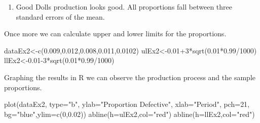 \documentclass[
  letterpaper,
  DIV=11,
  numbers=noendperiod]{scrreprt}
\newenvironment{Shaded}{\begin{snugshade}}{\end{snugshade}}
\newcommand{\AttributeTok}[1]{\textcolor[rgb]{0.40,0.45,0.13}{#1}}
\newcommand{\DecValTok}[1]{\textcolor[rgb]{0.68,0.00,0.00}{#1}}
\newcommand{\FloatTok}[1]{\textcolor[rgb]{0.68,0.00,0.00}{#1}}
\newcommand{\FunctionTok}[1]{\textcolor[rgb]{0.28,0.35,0.67}{#1}}
\newcommand{\NormalTok}[1]{\textcolor[rgb]{0.00,0.23,0.31}{#1}}
\newcommand{\OtherTok}[1]{\textcolor[rgb]{0.00,0.23,0.31}{#1}}
\newcommand{\SpecialCharTok}[1]{\textcolor[rgb]{0.37,0.37,0.37}{#1}}
\newcommand{\StringTok}[1]{\textcolor[rgb]{0.13,0.47,0.30}{#1}}
\providecommand{\tightlist}{%
  \setlength{\itemsep}{0pt}\setlength{\parskip}{0pt}}\usepackage{longtable,booktabs,array}
\begin{document}
\begin{enumerate}
\def\labelenumi{\arabic{enumi}.}
\setcounter{enumi}{1}
\tightlist
\item
  Good Dolls production looks good. All proportions fall between three
  standard errors of the mean.
\end{enumerate}

Once more we can calculate upper and lower limits for the proportions.

\begin{Shaded}
\begin{Highlighting}[numbers=left,,]
\NormalTok{dataEx2}\OtherTok{\textless{}{-}}\FunctionTok{c}\NormalTok{(}\FloatTok{0.009}\NormalTok{,}\FloatTok{0.012}\NormalTok{,}\FloatTok{0.008}\NormalTok{,}\FloatTok{0.011}\NormalTok{,}\FloatTok{0.0102}\NormalTok{)}
\NormalTok{ulEx2}\OtherTok{\textless{}{-}}\FloatTok{0.01}\SpecialCharTok{+}\DecValTok{3}\SpecialCharTok{*}\FunctionTok{sqrt}\NormalTok{(}\FloatTok{0.01}\SpecialCharTok{*}\FloatTok{0.99}\SpecialCharTok{/}\DecValTok{1000}\NormalTok{)}
\NormalTok{llEx2}\OtherTok{\textless{}{-}}\FloatTok{0.01}\DecValTok{{-}3}\SpecialCharTok{*}\FunctionTok{sqrt}\NormalTok{(}\FloatTok{0.01}\SpecialCharTok{*}\FloatTok{0.99}\SpecialCharTok{/}\DecValTok{1000}\NormalTok{)}
\end{Highlighting}
\end{Shaded}

Graphing the results in R we can observe the production process and the
sample proportions.

\begin{Shaded}
\begin{Highlighting}[numbers=left,,]
\FunctionTok{plot}\NormalTok{(dataEx2, }\AttributeTok{type=}\StringTok{"b"}\NormalTok{, }\AttributeTok{ylab=}\StringTok{"Proportion Defective"}\NormalTok{,}
     \AttributeTok{xlab=}\StringTok{"Period"}\NormalTok{, }\AttributeTok{pch=}\DecValTok{21}\NormalTok{, }\AttributeTok{bg=}\StringTok{"blue"}\NormalTok{,}\AttributeTok{ylim=}\FunctionTok{c}\NormalTok{(}\DecValTok{0}\NormalTok{,}\FloatTok{0.02}\NormalTok{))}
\FunctionTok{abline}\NormalTok{(}\AttributeTok{h=}\NormalTok{ulEx2,}\AttributeTok{col=}\StringTok{"red"}\NormalTok{)}
\FunctionTok{abline}\NormalTok{(}\AttributeTok{h=}\NormalTok{llEx2,}\AttributeTok{col=}\StringTok{"red"}\NormalTok{)}
\end{Highlighting}
\end{Shaded}
\end{document}
